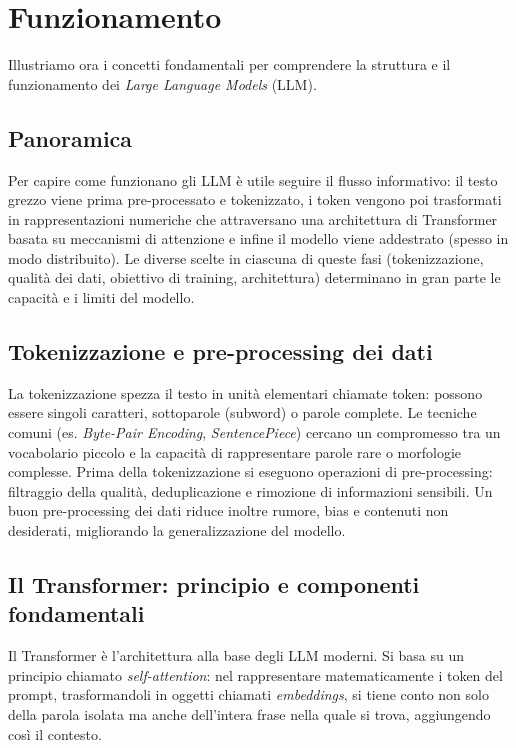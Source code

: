\newpage
\section{Funzionamento}

Illustriamo ora i concetti fondamentali per comprendere
la struttura e il funzionamento dei \textit{Large Language Models} (LLM).

\subsection{Panoramica}
Per capire come funzionano gli LLM è utile seguire il flusso informativo: il testo grezzo viene prima pre-processato e tokenizzato, i token vengono poi trasformati in rappresentazioni numeriche che attraversano una architettura di Transformer basata su meccanismi di attenzione e infine il modello viene addestrato (spesso in modo distribuito). Le diverse scelte in ciascuna di queste fasi (tokenizzazione, qualità dei dati, obiettivo di training, architettura) determinano in gran parte le capacità e i limiti del modello.

\subsection{Tokenizzazione e pre-processing dei dati}
La tokenizzazione spezza il testo in unità elementari chiamate token: possono essere singoli caratteri, sottoparole (subword) o parole complete. Le tecniche comuni (es. \textit{Byte-Pair Encoding}, \textit{SentencePiece}) cercano un compromesso tra un vocabolario piccolo e la capacità di rappresentare parole rare o morfologie complesse. Prima della tokenizzazione si eseguono operazioni di pre-processing: filtraggio della qualità, deduplicazione e rimozione di informazioni sensibili. Un buon pre-processing dei dati riduce inoltre rumore, bias e contenuti non desiderati, migliorando la generalizzazione del modello.

\subsection{Il Transformer: principio e componenti fondamentali}
Il Transformer è l'architettura alla base degli LLM moderni. Si basa su un principio chiamato \textit{self-attention}: 
nel rappresentare matematicamente i token del prompt, trasformandoli in oggetti chiamati \textit{embeddings}, si tiene conto non solo della parola isolata ma anche dell'intera frase 
nella quale si trova, aggiungendo così il contesto.

